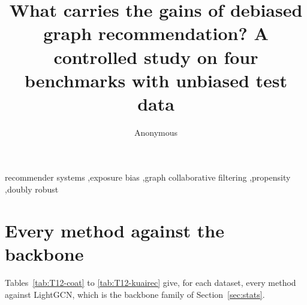 \documentclass[preprint,12pt,authoryear]{elsarticle}
\begin{document}
\begin{frontmatter}
\title{What carries the gains of debiased graph recommendation? A controlled study on four benchmarks with unbiased test data}
\author{Anonymous}
\begin{abstract}

\end{abstract}
\begin{keyword}
recommender systems \sep exposure bias \sep graph collaborative filtering \sep propensity \sep doubly robust
\end{keyword}
\end{frontmatter}







\appendix
\section{Every method against the backbone}\label{app:backbone}
Tables~\ref{tab:T12-coat} to \ref{tab:T12-kuairec} give, for each dataset, every method against LightGCN, which is the backbone family of Section~\ref{sec:stats}.







\end{document}
